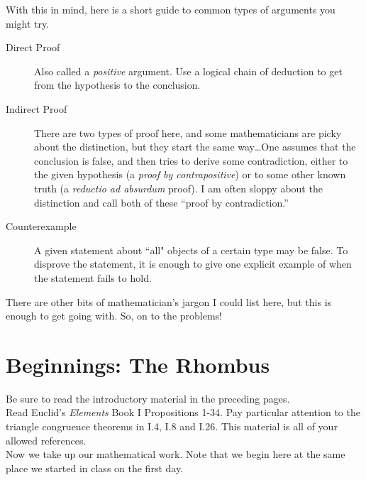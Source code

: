 \documentclass{tufte-handout}
\theoremstyle{definition}
\begin{document}
With this in mind, here is a short guide to common types of arguments you might try.

\begin{description}
\item[Direct Proof] Also called a \emph{positive} argument. Use a logical chain of deduction to get from the hypothesis to the conclusion.

\item[Indirect Proof] There are two types of proof here, and some mathematicians are picky about the distinction, but they start the same way\dots One assumes that the conclusion is false, and then tries to derive some contradiction, either to the given hypothesis (a \emph{proof by contrapositive}) or to some other known truth (a \emph{reductio ad absurdum} proof). I am often sloppy about the distinction and call both of these ``proof by contradiction.''

\item[Counterexample] A given statement about ``all" objects of a certain type may be false. To disprove the statement, it is enough to give one explicit example of when the statement fails to hold.
\end{description}

There are other bits of mathematician's jargon I could list here, but this is enough to get going with. So, on to the problems!





\begin{fullwidth}

\end{fullwidth}

\vfill
\pagebreak

\setcounter{section}{1}
\section{Beginnings: The Rhombus}\label{section:rhombi}

Be sure to read the introductory material in the preceding pages.\\

Read Euclid's \emph{Elements} Book I Propositions 1-34. Pay particular attention to the triangle congruence theorems in I.4, I.8 and I.26. This material is all of your allowed references.\\

Now we take up our mathematical work. Note that we begin here at the same place we started in class on the first day.
\end{document}
